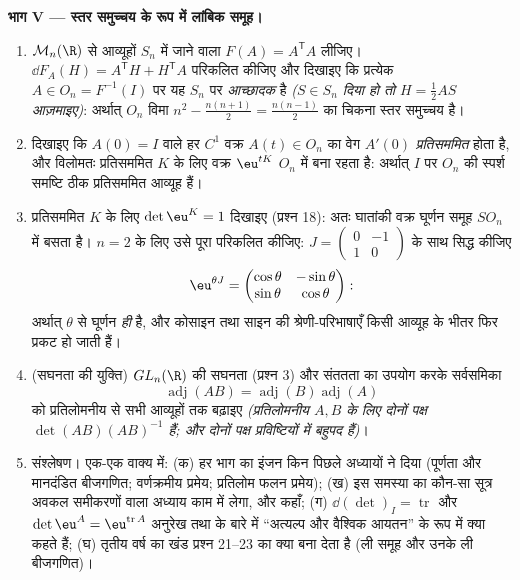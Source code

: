\begin{problem}
\medskip
\noindent\textbf{भाग V --- स्तर समुच्चय के रूप में लांबिक समूह।}
\begin{enumerate}[resume]
  \item $\mathcal M_n(\R)$ से  आव्यूहों $S_n$ में जाने वाला $F(A) = A^{\mathsf T}A$ लीजिए। $\dd F_A(H) =
        A^{\mathsf T}H + H^{\mathsf T}A$ परिकलित
        कीजिए और दिखाइए कि प्रत्येक $A \in O_n = F^{-1}(I)$ पर यह  $S_n$ पर \emph{आच्छादक}
        है \emph{($S \in S_n$ दिया हो तो $H = \frac12 AS$ आज़माइए)}: अर्थात् $O_n$ विमा $n^2 - \frac{n(n+1)}2 = \frac{n(n-1)}2$ का
        चिकना स्तर समुच्चय है।
  \item दिखाइए कि $A(0) =
        I$ वाले हर $C^1$ वक्र $A(t) \in O_n$ का वेग $A'(0)$
        \emph{प्रतिसममित} होता है, और विलोमतः प्रतिसममित $K$ के लिए वक्र
        $\eu^{tK}$ $O_n$ में बना रहता है: अर्थात् $I$ पर $O_n$ की स्पर्श समष्टि
        ठीक प्रतिसममित आव्यूह हैं।
  \item प्रतिसममित $K$ के लिए $\det\eu^{K} = 1$ दिखाइए (प्रश्न 18): अतः घातांकी वक्र
        घूर्णन समूह $SO_n$ में बसता है। $n = 2$ के लिए उसे पूरा परिकलित कीजिए:
        $J =
        \begin{pmatrix}0 & -1\\ 1 & 0\end{pmatrix}$ के साथ सिद्ध कीजिए
        \[
        \eu^{\theta J} = \begin{pmatrix} \cos\theta &
        -\sin\theta\\ \sin\theta & \cos\theta\end{pmatrix} :
        \]
        अर्थात्  $\theta$ से घूर्णन \emph{ही} है, और कोसाइन तथा
        साइन की श्रेणी-परिभाषाएँ किसी आव्यूह के भीतर फिर प्रकट हो जाती
        हैं।
  \item (सघनता की युक्ति) $GL_n(\R)$ की सघनता (प्रश्न 3) और संततता का उपयोग
        करके सर्वसमिका
        \[
        \operatorname{adj}(AB) =
        \operatorname{adj}(B)\operatorname{adj}(A)
        \]
        को प्रतिलोमनीय से सभी आव्यूहों तक बढ़ाइए \emph{(प्रतिलोमनीय $A, B$
        के लिए दोनों पक्ष $\det(AB)(AB)^{-1}$ हैं; और दोनों पक्ष प्रविष्टियों में बहुपद
        हैं)}।
  \item संश्लेषण। एक-एक वाक्य में: (क) हर भाग का इंजन किन पिछले अध्यायों
        ने दिया (पूर्णता और मानदंडित बीजगणित; वर्णक्रमीय प्रमेय; प्रतिलोम
        फलन प्रमेय); (ख) इस समस्या का कौन-सा सूत्र अवकल समीकरणों वाला
        अध्याय काम में लेगा, और कहाँ; (ग) $\dd(\det)_I = \operatorname{tr}$ और $\det\eu^A =
        \eu^{\operatorname{tr}A}$ अनुरेख तथा 
        के बारे में ``अत्यल्प और वैश्विक आयतन'' के रूप में क्या कहते हैं;
        (घ) तृतीय वर्ष का खंड प्रश्न 21--23 का क्या बना देता है (ली समूह
        और उनके ली बीजगणित)।
\end{enumerate}
\end{problem}
